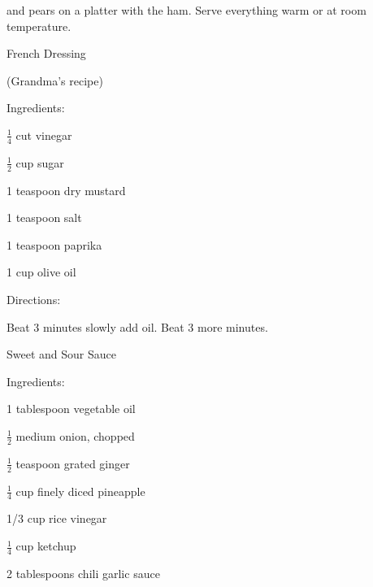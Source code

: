 \documentclass[a4paper,portrait,12pt]{book}
\begin{document}
and pears on a platter with the ham. Serve everything warm or at room temperature.







\newpage
French Dressing




(Grandma's recipe)







Ingredients:




$\frac{1}{4}$ cut vinegar




$\frac{1}{2}$ cup sugar




1 teaspoon dry mustard




1 teaspoon salt




1 teaspoon paprika




1 cup olive oil




Directions:




Beat 3 minutes slowly add oil. Beat 3 more minutes.







\newpage
Sweet and Sour Sauce




Ingredients:




1 tablespoon vegetable oil




$\frac{1}{2}$ medium onion, chopped




$\frac{1}{2}$ teaspoon grated ginger




$\frac{1}{4}$ cup finely diced pineapple




1/3 cup rice vinegar




$\frac{1}{4}$ cup ketchup




2 tablespoons chili garlic sauce
\end{document}
